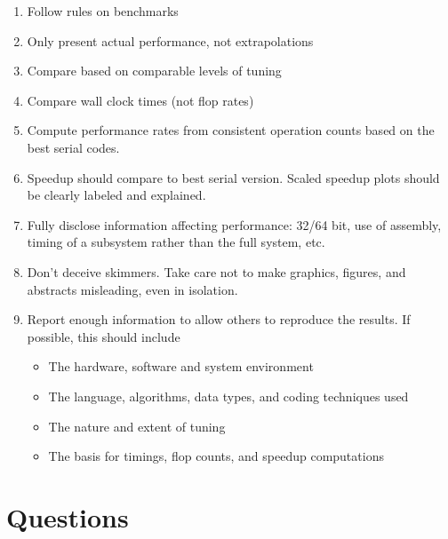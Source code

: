 \documentclass[12pt, leqno]{article} %
\begin{document}
\begin{enumerate}
\item
  Follow rules on benchmarks
\item
  Only present actual performance, not extrapolations
\item
  Compare based on comparable levels of tuning
\item
  Compare wall clock times (not flop rates)
\item
  Compute performance rates from consistent operation counts based on
  the best serial codes.
\item
  Speedup should compare to best serial version. Scaled speedup plots
  should be clearly labeled and explained.
\item
  Fully disclose information affecting performance: 32/64 bit, use of
  assembly, timing of a subsystem rather than the full system, etc.
\item
  Don't deceive skimmers. Take care not to make graphics, figures, and
  abstracts misleading, even in isolation.
\item
  Report enough information to allow others to reproduce the results. If
  possible, this should include
\begin{itemize}
\item
  The hardware, software and system environment
\item
  The language, algorithms, data types, and coding techniques used
\item
  The nature and extent of tuning
\item
  The basis for timings, flop counts, and speedup computations
\end{itemize}
\end{enumerate}


\section{Questions}
\end{document}
